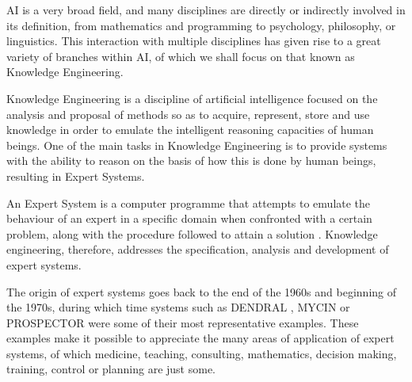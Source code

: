 \begin{table}[]
\centering
\caption{Definitions of AI}
\label{lb:ai-def}
\end{table}

AI is a very broad field, and many disciplines are directly or indirectly involved in its definition, from mathematics and programming to psychology, philosophy, or linguistics. This interaction with multiple disciplines has given rise to a great variety of branches within AI, of which we shall focus on that known as Knowledge Engineering.

Knowledge Engineering is a discipline of artificial intelligence focused on the analysis and proposal of methods so as to acquire, represent, store and use knowledge in order to emulate the intelligent reasoning capacities of human beings. One of the main tasks in Knowledge Engineering is to provide systems with the ability to reason on the basis of how this is done by human beings, resulting in Expert Systems.

An Expert System is a computer programme that attempts to emulate the behaviour of an expert in a specific domain when confronted with a certain problem, along with the procedure followed to attain a solution \cite{mate_1998, waterman_guide_1986}. Knowledge engineering, therefore, addresses the specification, analysis and development of expert systems.

The origin of expert systems goes back to the end of the 1960s and beginning of the 1970s, during which time systems such as DENDRAL \cite{lederberg_how_1987}, MYCIN \cite{shortliffe_mycin_1974} or PROSPECTOR \cite{gaschnig_prospector_1982} were some of their most representative examples. These examples make it possible to appreciate the many areas of application of expert systems, of which medicine, teaching, consulting, mathematics, decision making, training, control or planning are just some.

